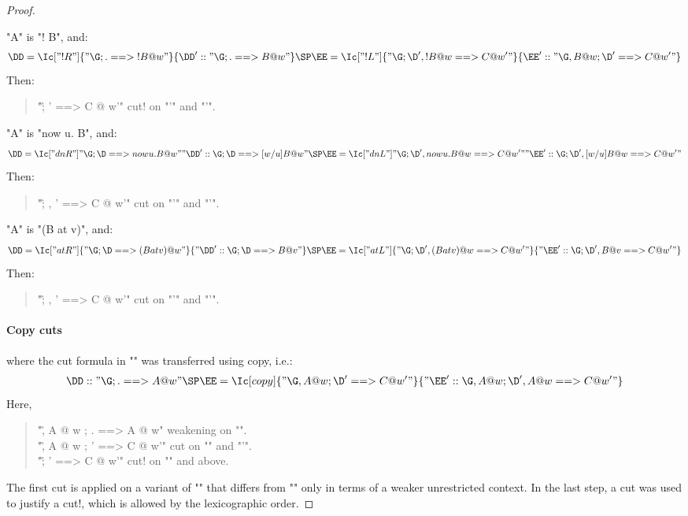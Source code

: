 \documentclass{article}
\begin{document}
\begin{proof}
\begin{ecom} 
  \item "A" is "! B", and:
    \begin{gather*}
      \DD =
      \Ic["!R"]{"\G ; . ==> {! B} @ w"}
         {\DD' :: "\G ; . ==> B @ w"}
      \SP
      \EE =
      \Ic["!L"]{"\G ; \D', {! B} @ w ==> C @ {w'}"}
         {\EE' :: "\G, B @ w ; \D' ==> C @ {w'}"}
    \end{gather*}
    Then:
    \begin{quote}
      "\G ; \D' ==> C @ {w'}" \by cut! on "\DD'" and "\EE'".
    \end{quote}

  \item "A" is "now u. B", and:
    \begin{gather*}
      \DD =
      \Ic["{dn} R"]{"\G ; \D ==> now u. B @ w"}
         {"\DD' :: \G ; \D ==> [w/u] B @ w"}
      \SP
      \EE =
      \Ic["{dn} L"]{"\G ; \D', now u. B @ w ==> C @ {w'}"}
         {"\EE' :: \G ; \D', [w/u] B @ w ==> C @ {w'}"}
    \end{gather*}
    Then:
    \begin{quote}
      "\G ; \D, \D' ==> C @ {w'}" \by cut on "\DD'" and "\EE'".
    \end{quote}

  \item "A" is "(B at v)", and:
    \begin{gather*}
      \DD =
      \Ic["at R"]{"\G ; \D ==> (B at v) @ w"}
         {"\DD' :: \G ; \D ==> B @ v"}
      \SP
      \EE =
      \Ic["at L"]{"\G ; \D', (B at v) @ w ==> C @ {w'}"}
         {"\EE' :: \G ; \D', B @ v ==> C @ {w'}"}
    \end{gather*}
    Then:
    \begin{quote}
      "\G ; \D, \D' ==> C @ {w'}" \by cut on "\DD'" and "\EE'".
    \end{quote}
  \end{ecom}

  \paragraph{Copy cuts} where the cut formula in "\EE" was transferred using copy, i.e.:
  \begin{gather*}
    \DD :: "\G ; . ==> A @ w"
    \SP
    \EE =
    \Ic[copy]{"\G, A @ w ; \D' ==> C @ {w'}"}
       {"\EE' :: \G, A @ w ; \D', A @ w ==> C @ {w'}"}
  \end{gather*}
  Here,
  \begin{quote}
    "\G, A @ w ; . ==> A @ w" \by weakening on "\DD".\\
    "\G, A @ w ; \D' ==> C @ {w'}" \by cut on "\DD" and "\EE'".\\
    "\G ; \D' ==> C @ {w'}" \by cut! on "\DD" and above.
  \end{quote}
  The first cut is applied on a variant of "\DD" that differs from "\DD" only in terms of a weaker
  unrestricted context. In the last step, a cut was used to justify a cut!, which is allowed by the
  lexicographic order.


\end{proof}
\end{document}
